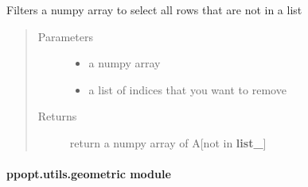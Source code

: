\documentclass[letterpaper,10pt,english]{sphinxmanual}
\begin{document}
\begin{fulllineitems}
\label{\detokenize{ppopt.utils:ppopt.utils.general_utils.select_not_in_list}}
\sphinxAtStartPar
Filters a numpy array to select all rows that are not in a list
\begin{quote}\begin{description}
\item[{Parameters}] \leavevmode\begin{itemize}
\item {} 
\sphinxAtStartPar
{} \textendash{} a numpy array

\item {} 
\sphinxAtStartPar
{} \textendash{} a list of indices that you want to remove

\end{itemize}

\item[{Returns}] \leavevmode
\sphinxAtStartPar
return a numpy array of A{[}not in {\color{red}\bfseries{}list\_}{]}

\end{description}\end{quote}

\end{fulllineitems}



\paragraph{ppopt.utils.geometric module}
\label{\detokenize{ppopt.utils:module-ppopt.utils.geometric}}\label{\detokenize{ppopt.utils:ppopt-utils-geometric-module}}
\end{document}
